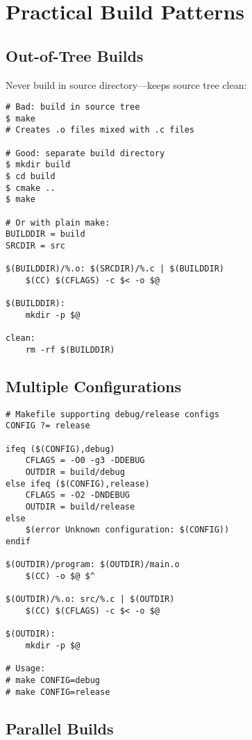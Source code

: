 \section{Practical Build Patterns}

\subsection{Out-of-Tree Builds}

Never build in source directory—keeps source tree clean:

\begin{lstlisting}
# Bad: build in source tree
$ make
# Creates .o files mixed with .c files

# Good: separate build directory
$ mkdir build
$ cd build
$ cmake ..
$ make

# Or with plain make:
BUILDDIR = build
SRCDIR = src

$(BUILDDIR)/%.o: $(SRCDIR)/%.c | $(BUILDDIR)
	$(CC) $(CFLAGS) -c $< -o $@

$(BUILDDIR):
	mkdir -p $@

clean:
	rm -rf $(BUILDDIR)
\end{lstlisting}

\subsection{Multiple Configurations}

\begin{lstlisting}
# Makefile supporting debug/release configs
CONFIG ?= release

ifeq ($(CONFIG),debug)
    CFLAGS = -O0 -g3 -DDEBUG
    OUTDIR = build/debug
else ifeq ($(CONFIG),release)
    CFLAGS = -O2 -DNDEBUG
    OUTDIR = build/release
else
    $(error Unknown configuration: $(CONFIG))
endif

$(OUTDIR)/program: $(OUTDIR)/main.o
	$(CC) -o $@ $^

$(OUTDIR)/%.o: src/%.c | $(OUTDIR)
	$(CC) $(CFLAGS) -c $< -o $@

$(OUTDIR):
	mkdir -p $@

# Usage:
# make CONFIG=debug
# make CONFIG=release
\end{lstlisting}

\subsection{Parallel Builds}

